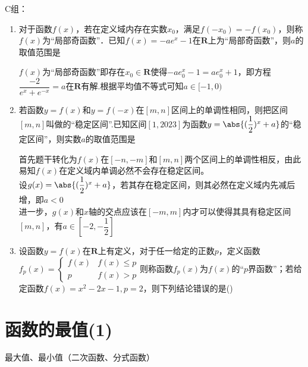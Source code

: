 \begin{enumerate}
C组：\\
\begin{enumerate}
    \item 对于函数$f(x)$，若在定义域内存在实数$x_0$，满足$f(-x_0) = -f(x_0)$，则称$f(x)$为“局部奇函数”．已知$f(x) = -ae^x-1$在$\mathbf{R}$上为“局部奇函数”，则$a$的取值范围是\blkda{$[-1, 0)$}
    \begin{jieda}
        $f(x)$为“局部奇函数”即存在$x_0 \in \mathbf{R}$使得$-ae^x_0-1 = ae^x_0+1$，即方程$\dfrac{-2}{e^x+e^{-x}} = a$在$\mathbf{R}$有解.根据平均值不等式可知$a \in [-1, 0)$
    \end{jieda}
    \item 若函数$y = f(x)$和$y = f(-x)$在$[m, n]$区间上的单调性相同，则把区间$[m, n]$叫做的“稳定区间”.已知区间$[1, 2023]$为函数$y = \abs{(\dfrac{1}{2})^x+a}$的“稳定区间”，则实数$a$的取值范围是\blkda{$[-2, -\dfrac{1}{2}]$}
    \begin{jieda}
        首先题干转化为$f(x)$在$[-n, -m]$和$[m, n]$两个区间上的单调性相反，由此易知$f(x)$在定义域内单调必然不会存在稳定区间。\\
        设$g(x) = \abs{(\dfrac{1}{2})^x+a}$，若其存在稳定区间，则其必然在定义域内先减后增，即$a < 0$ \\
        进一步，$g(x)$和$x$轴的交点应该在$[-m, m]$内才可以使得其具有稳定区间$[m, n]$，有$a \in [-2, -\dfrac{1}{2}]$
    \end{jieda}
    \item 设函数$y=f(x)$在$\mathbf{R}$上有定义，对于任一给定的正数$p$，定义函数 \\
    $f_p(x) = \left \{ \begin{array}{cc}
        f(x) & f(x) \leq p \\
        p & f(x) > p
    \end{array}\right.$则称函数$f_p(x)$为$f(x)$的“$p$界函数”；若给定函数$f(x)=x^2-2x-1, p=2$，则下列结论错误的是\dotfill()
\end{enumerate}


\end{enumerate}


\section{函数的最值(1)}

\zsd 最大值、最小值（二次函数、分式函数）

